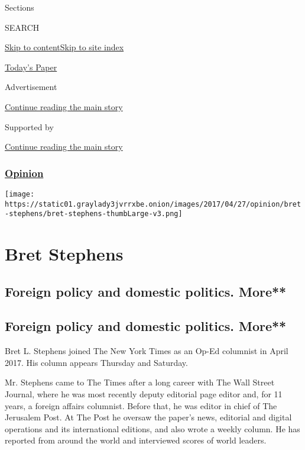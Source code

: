 Sections

SEARCH

\protect\hyperlink{site-content}{Skip to
content}\protect\hyperlink{site-index}{Skip to site index}

\href{https://myaccount.nytimes3xbfgragh.onion/auth/login?response_type=cookie\&client_id=vi}{}

\href{https://www.nytimes3xbfgragh.onion/section/todayspaper}{Today's
Paper}

Advertisement

\protect\hyperlink{after-top}{Continue reading the main story}

Supported by

\protect\hyperlink{after-sponsor}{Continue reading the main story}

\hypertarget{opinion}{%
\subsubsection{\texorpdfstring{\href{/section/opinion}{Opinion}}{Opinion}}\label{opinion}}

\texttt{[image: https://static01.graylady3jvrrxbe.onion/images/2017/04/27/opinion/bret-stephens/bret-stephens-thumbLarge-v3.png]}

\hypertarget{bret-stephens}{%
\section{Bret Stephens}\label{bret-stephens}}

\hypertarget{foreign-policy-and-domestic-politics-more}{%
\subsection{Foreign policy and domestic politics.
More**}\label{foreign-policy-and-domestic-politics-more}}

\hypertarget{foreign-policy-and-domestic-politics-more-1}{%
\subsection{Foreign policy and domestic politics.
More**}\label{foreign-policy-and-domestic-politics-more-1}}

Bret L. Stephens joined The New York Times as an Op-Ed columnist in
April 2017. His column appears Thursday and Saturday.

Mr. Stephens came to The Times after a long career with The Wall Street
Journal, where he was most recently deputy editorial page editor and,
for 11 years, a foreign affairs columnist. Before that, he was editor in
chief of The Jerusalem Post. At The Post he oversaw the paper's news,
editorial and digital operations and its international editions, and
also wrote a weekly column. He has reported from around the world and
interviewed scores of world leaders.

